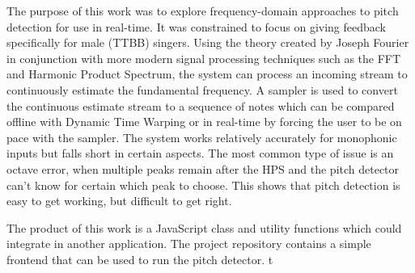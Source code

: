 The purpose of this work was to explore frequency-domain approaches to pitch detection for use in real-time. It was constrained to focus on giving feedback specifically for male (TTBB) singers. Using the theory created by Joseph Fourier in conjunction with more modern signal processing techniques such as the FFT and Harmonic Product Spectrum, the system can process an incoming stream to continuously estimate the fundamental frequency. A sampler is used to convert the continuous estimate stream to a sequence of notes which can be compared offline with Dynamic Time Warping or in real-time by forcing the user to be on pace with the sampler. The system works relatively accurately for monophonic inputs but falls short in certain aspects. The most common type of issue is an octave error, when multiple peaks remain after the HPS and the pitch detector can't know for certain which peak to choose. This shows that pitch detection is easy to get working, but difficult to get right. 

The product of this work is a JavaScript class and utility functions which could integrate in another application. The project repository contains a simple frontend that can be used to run the pitch detector.  
t